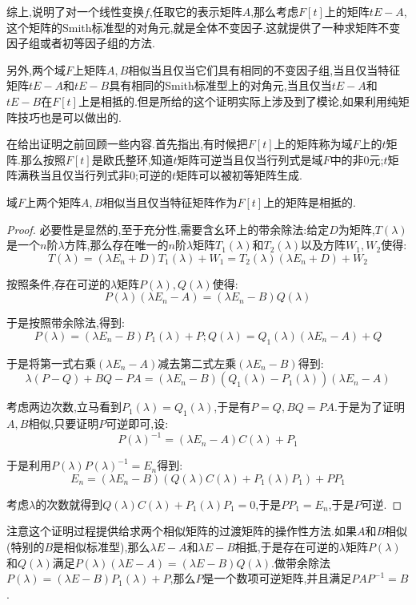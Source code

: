 综上,说明了对一个线性变换$f$,任取它的表示矩阵$A$,那么考虑$F[t]$上的矩阵$tE-A$,这个矩阵的Smith标准型的对角元,就是全体不变因子.这就提供了一种求矩阵不变因子组或者初等因子组的方法.

另外,两个域$F$上矩阵$A,B$相似当且仅当它们具有相同的不变因子组,当且仅当特征矩阵$tE-A$和$tE-B$具有相同的Smith标准型上的对角元,当且仅当$tE-A$和$tE-B$在$F[t]$上是相抵的.但是所给的这个证明实际上涉及到了模论,如果利用纯矩阵技巧也是可以做出的.

在给出证明之前回顾一些内容.首先指出,有时候把$F[t]$上的矩阵称为域$F$上的$t$矩阵.那么按照$F[t]$是欧氏整环,知道$t$矩阵可逆当且仅当行列式是域$F$中的非0元;$t$矩阵满秩当且仅当行列式非0;可逆的$t$矩阵可以被初等矩阵生成.

域$F$上两个矩阵$A,B$相似当且仅当特征矩阵作为$F[t]$上的矩阵是相抵的.

\begin{proof}
	
	必要性是显然的,至于充分性,需要含幺环上的带余除法:给定$D$为矩阵,$T(\lambda)$是一个$n$阶$\lambda$方阵,那么存在唯一的$n$阶$\lambda$矩阵$T_{1}(\lambda)$和$T_2(\lambda)$以及方阵$W_1,W_2$使得:
	$$T(\lambda)=(\lambda E_n+D)T_1(\lambda)+W_1=T_2(\lambda)(\lambda E_n+D)+W_2$$
	
	按照条件,存在可逆的$\lambda$矩阵$P(\lambda),Q(\lambda)$使得:
	$$P(\lambda)(\lambda E_n-A)=(\lambda E_n-B)Q(\lambda)$$
	
	于是按照带余除法,得到:
	$$P(\lambda)=(\lambda E_n-B)P_1(\lambda)+P;Q(\lambda)=Q_1(\lambda)(\lambda E_n-A)+Q$$
	
	于是将第一式右乘$(\lambda E_n-A)$减去第二式左乘$(\lambda E_n-B)$得到:
	$$\lambda(P-Q)+BQ-PA=(\lambda E_n-B)(Q_1(\lambda)-P_1(\lambda))(\lambda E_n-A)$$
	
	考虑两边次数,立马看到$P_1(\lambda)=Q_1(\lambda)$,于是有$P=Q,BQ=PA$.于是为了证明$A,B$相似,只要证明$P$可逆即可,设:
	$$P(\lambda)^{-1}=(\lambda E_n-A)C(\lambda)+P_1$$
	
	于是利用$P(\lambda)P(\lambda)^{-1}=E_n$得到:
	$$E_n=(\lambda E_n-B)(Q(\lambda)C(\lambda)+P_1(\lambda)P_1)+PP_1$$
	
	考虑$\lambda$的次数就得到$Q(\lambda)C(\lambda)+P_1(\lambda)P_1=0$,于是$PP_1=E_n$,于是$P$可逆.
	
\end{proof}

注意这个证明过程提供给求两个相似矩阵的过渡矩阵的操作性方法.如果$A$和$B$相似(特别的$B$是相似标准型),那么$\lambda E-A$和$\lambda E-B$相抵,于是存在可逆的$\lambda$矩阵$P(\lambda)$和$Q(\lambda)$满足$P(\lambda)(\lambda E-A)=(\lambda E-B)Q(\lambda)$.做带余除法$P(\lambda)=(\lambda E-B)P_1(\lambda)+P$,那么$P$是一个数项可逆矩阵,并且满足$PAP^{-1}=B$.

